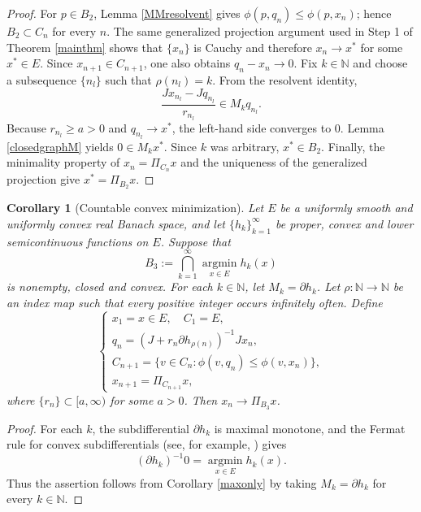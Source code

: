 \documentclass[leqno,12pt]{amsart}
\newtheorem{corollary}[theorem]{Corollary}
\theoremstyle{definition}
\numberwithin{equation}{section}
\begin{document}
\begin{proof}
For $p\in B_2$, Lemma \ref{MMresolvent} gives $\phi(p,q_n)\leq\phi(p,x_n)$; hence $B_2\subset C_n$ for every $n$. The same generalized projection argument used in Step 1 of Theorem \ref{mainthm} shows that $\{x_n\}$ is Cauchy and therefore $x_n\to x^{*}$ for some $x^{*}\in E$. Since $x_{n+1}\in C_{n+1}$, one also obtains $q_n-x_n\to0$. Fix $k\in\mathbb N$ and choose a subsequence $\{n_l\}$ such that $\rho(n_l)=k$. From the resolvent identity,
\[
\frac{Jx_{n_l}-Jq_{n_l}}{r_{n_l}}\in M_kq_{n_l}.
\]
Because $r_{n_l}\geq a>0$ and $q_{n_l}\to x^{*}$, the left-hand side converges to $0$. Lemma \ref{closedgraphM} yields $0\in M_kx^{*}$. Since $k$ was arbitrary, $x^{*}\in B_2$. Finally, the minimality property of $x_n=\Pi_{C_n}x$ and the uniqueness of the generalized projection give $x^{*}=\Pi_{B_2}x$.
\end{proof}

\begin{corollary}[Countable convex minimization]\label{convexmin}
Let $E$ be a uniformly smooth and uniformly convex real Banach space, and let $\{h_k\}_{k=1}^{\infty}$ be proper, convex and lower semicontinuous functions on $E$. Suppose that
\[
B_3:=\bigcap_{k=1}^{\infty}\operatorname*{argmin}_{x\in E} h_k(x)
\]
is nonempty, closed and convex. For each $k\in\mathbb N$, let $M_k=\partial h_k$. Let $\rho:\mathbb N\to\mathbb N$ be an index map such that every positive integer occurs infinitely often. Define
\[
\left\{
\begin{array}{ll}
x_1=x\in E,\quad C_1=E,\\
q_n=(J+r_n\partial h_{\rho(n)})^{-1}Jx_n,\\
C_{n+1}=\{v\in C_n:\phi(v,q_n)\leq\phi(v,x_n)\},\\
x_{n+1}=\Pi_{C_{n+1}}x,
\end{array}
\right.
\]
where $\{r_n\}\subset[a,\infty)$ for some $a>0$. Then $x_n\to\Pi_{B_3}x$.
\end{corollary}

\begin{proof}
For each $k$, the subdifferential $\partial h_k$ is maximal monotone, and the Fermat rule for convex subdifferentials (see, for example, \cite[Section 23]{Rockafellar1970CA}) gives
\[
(\partial h_k)^{-1}0=\operatorname*{argmin}_{x\in E}h_k(x).
\]
Thus the assertion follows from Corollary \ref{maxonly} by taking $M_k=\partial h_k$ for every $k\in\mathbb N$.
\end{proof}
\end{document}
